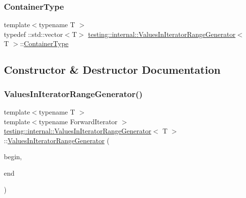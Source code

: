 \subsubsection{\texorpdfstring{ContainerType}{ContainerType}\hspace{0.1cm}{\footnotesize\ttfamily [3/3]}}
{\footnotesize\ttfamily template$<$typename T $>$ \\
typedef \+::std\+::vector$<$T$>$ \mbox{\hyperlink{classtesting_1_1internal_1_1_values_in_iterator_range_generator}{testing\+::internal\+::\+Values\+In\+Iterator\+Range\+Generator}}$<$ T $>$\+::\mbox{\hyperlink{classtesting_1_1internal_1_1_values_in_iterator_range_generator_afab6b799a125b471a8784ced9cf7335c}{Container\+Type}}\hspace{0.3cm}{\ttfamily [private]}}



\subsection{Constructor \& Destructor Documentation}
\mbox{\label{classtesting_1_1internal_1_1_values_in_iterator_range_generator_a8b30f6028bc5739bbd7c24b0f0e409f7}} 
\subsubsection{\texorpdfstring{ValuesInIteratorRangeGenerator()}{ValuesInIteratorRangeGenerator()}\hspace{0.1cm}{\footnotesize\ttfamily [1/3]}}
{\footnotesize\ttfamily template$<$typename T $>$ \\
template$<$typename Forward\+Iterator $>$ \\
\mbox{\hyperlink{classtesting_1_1internal_1_1_values_in_iterator_range_generator}{testing\+::internal\+::\+Values\+In\+Iterator\+Range\+Generator}}$<$ T $>$\+::\mbox{\hyperlink{classtesting_1_1internal_1_1_values_in_iterator_range_generator}{Values\+In\+Iterator\+Range\+Generator}} (\begin{DoxyParamCaption}\item[{Forward\+Iterator}]{begin,  }\item[{Forward\+Iterator}]{end }\end{DoxyParamCaption})\hspace{0.3cm}{\ttfamily [inline]}}

